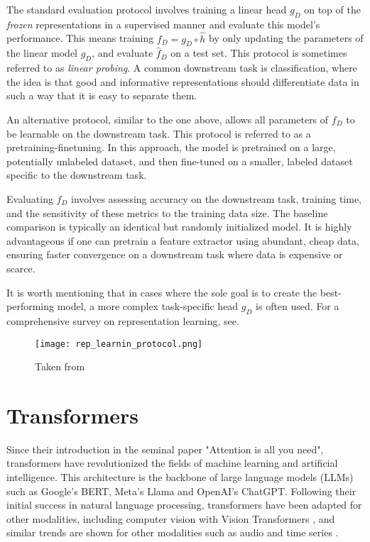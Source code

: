 \documentclass[../../thesis.tex]{subfiles}
\begin{document}
The standard evaluation protocol involves training a linear head $g_D$ on top of the \textit{frozen} representations in a supervised manner and evaluate this model's performance. This means training $f_D = g_D\circ \widehat{h}$ by only updating the parameters of the linear model $g_D$, and evaluate $\widehat{f}_D$ on a test set. This protocol is sometimes referred to as \textit{linear probing}. A common downstream task is classification, where the idea is that good and informative representations should differentiate data in such a way that it is easy to separate them. \newline

An alternative protocol, similar to the one above, allows all parameters of $f_D$ to be learnable on the downstream task. This protocol is referred to as a pretraining-finetuning. In this approach, the model is pretrained on a large, potentially unlabeled dataset, and then fine-tuned on a smaller, labeled dataset specific to the downstream task. \newline

Evaluating $f_D$ involves assessing accuracy on the downstream task, training time, and the sensitivity of these metrics to the training data size. The baseline comparison is typically an identical but randomly initialized model. It is highly advantageous if one can pretrain a feature extractor using abundant, cheap data, ensuring faster convergence on a downstream task where data is expensive or scarce.\newline

It is worth mentioning that in cases where the sole goal is to create the best-performing model, a more complex task-specific head $g_D$ is often used. For a comprehensive survey on representation learning, see\cite{nozawa2022empirical}.


\begin{figure}[h]
    \texttt{[image: rep\_learnin\_protocol.png]}
    \centering    
    \caption{Taken from \cite{nozawa2022empirical}}
\end{figure}


\section{Transformers}

Since their introduction in the seminal paper "Attention is all you need"\cite{vaswani2023attention}, transformers have revolutionized the fields of machine learning and artificial intelligence. This architecture is the backbone of large language models (LLMs) such as Google's BERT, Meta's Llama and OpenAI's ChatGPT. Following their initial success in natural language processing, transformers have been adapted for other modalities, including computer vision with Vision Transformers \cite{dosovitskiy2021image}, and similar trends are shown for other modalities such as audio \cite{latif2023transformers} and time series \cite{wen2023transformers}. \newline
\end{document}
